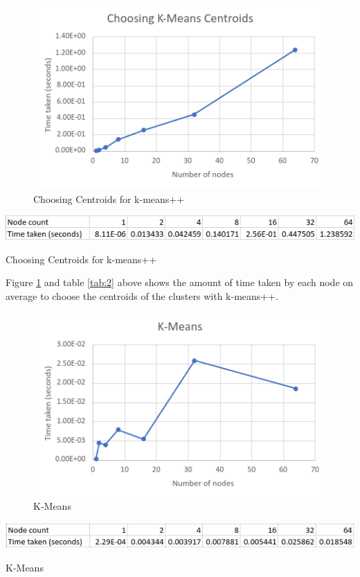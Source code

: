 \documentclass{article}
\begin{document}
\clearpage
\begin{figure}[!htb]
\includegraphics[width=\textwidth]{choose-centroids.png}
\caption{Choosing Centroids for k-means++}
\label{fig:2}
\end{figure}
\begin{table}[!htb]
\includegraphics[width=\textwidth]{choose-centroids-table.png}
\caption{Choosing Centroids for k-means++}
\label{tab:2}
\end{table}

Figure \ref{fig:2} and table \ref{tab:2} above shows the amount of time taken by each node on
average to choose the centroids of the clusters with k-means++.

\clearpage
\begin{figure}[!htb]
\includegraphics[width=\textwidth]{k-means.png}
\caption{K-Means}
\label{fig:3}
\end{figure}
\begin{table}[!htb]
\includegraphics[width=\textwidth]{k-means-table.png}
\caption{K-Means}
\label{tab:3}
\end{table}
\end{document}
